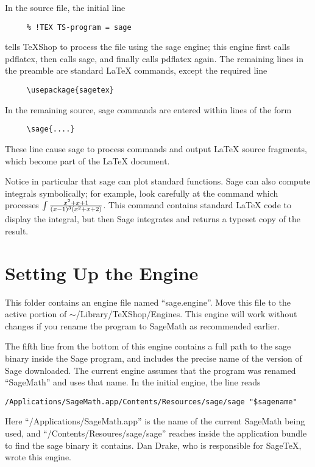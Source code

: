 \documentclass[11pt, oneside]{amsart}
\begin{document}
 In the source file, the initial line
\begin{verbatim}
     % !TEX TS-program = sage
\end{verbatim}
tells TeXShop to process the file using the sage engine; this engine first calls pdflatex, then calls sage, and finally calls pdflatex again.
The remaining lines in the preamble are standard LaTeX commands, except the required line
\begin{verbatim}
     \usepackage{sagetex}
\end{verbatim}
In the remaining source, sage commands are entered within lines of the form
\begin{verbatim}
     \sage{....}
\end{verbatim}
These line cause sage to process commands and output LaTeX source fragments, which become part of the LaTeX document.

Notice in particular that sage can plot standard functions. Sage can also compute integrals symbolically; for example, look carefully at the command which processes $\int {{x^2 + x + 1} \over {(x - 1)^3 (x^2 + x + 2)}}$. This command contains standard LaTeX code to display the integral, but then Sage integrates and returns a typeset copy of the result.


\section{Setting Up the Engine}

This folder contains an engine file named ``sage.engine''. Move this file to the active portion of $\sim$/Library/TeXShop/Engines. This engine will work without changes if you rename the program to SageMath as recommended earlier.

 The fifth line from the bottom of this engine contains a full path to the sage binary inside the Sage program, and includes the precise name of the version of Sage downloaded. The current engine assumes that the program was renamed ``SageMath'' and uses that name.  In the initial engine, the line reads
\begin{verbatim}
/Applications/SageMath.app/Contents/Resources/sage/sage "$sagename"
\end{verbatim}
Here ``/Applications/SageMath.app'' is the name of the current SageMath being
used, and ``/Contents/Resoures/sage/sage'' reaches inside the application bundle to find the
sage binary it contains.
Dan Drake, who is responsible for SageTeX, wrote this engine.
\end{document}
